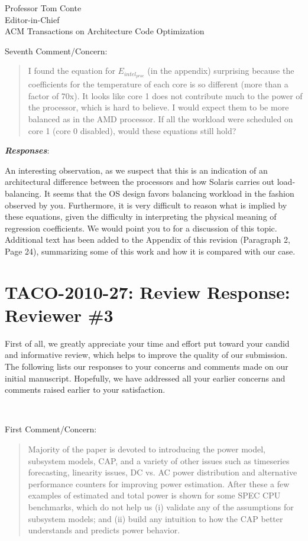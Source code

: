 \documentclass[10pt]{letter} %
\newenvironment{rviewcomment}
{~\\%
\begin{bfseries}}
{\end{bfseries}}
\newcommand{\rviewresponses}{\textbf{\textit{Responses}}:}
\begin{document}
\begin{letter}{Professor Tom Conte \\
Editor-in-Chief \\
ACM Transactions on Architecture Code Optimization }
\begin{rviewcomment}
  Seventh Comment/Concern:
\end{rviewcomment}
\begin{quote}
\begin{itshape}
I found the equation for $E_{intel_{proc}}$ (in the appendix) surprising
because the coefficients for the temperature of each core is so
different (more than a factor of 70x). It looks like core 1 does not
contribute much to the power of the processor, which is hard to
believe. I would expect them to be more balanced as in the AMD
processor. If all the workload were scheduled on core 1 (core 0
disabled), would these equations still hold?
\end{itshape}
\end{quote}

\rviewresponses 

An interesting observation, as we suspect that this is
an indication of an architectural difference between the processors and
how Solaris carries out load-balancing.  It seems that the OS design
favors balancing workload in the fashion observed by you.  Furthermore,
it is very difficult to reason what is implied by these equations, given
the difficulty in interpreting the physical meaning of regression
coefficients.  We would point you to \cite{McCullough2011} for a
discussion of this topic. Additional text has been added to the Appendix
of this revision (Paragraph 2, Page 24), summarizing some of this work
and how it is compared with our case.  


\clearpage
\section{TACO-2010-27: Review Response: Reviewer \#3}
\label{sec-3}
First of all, we greatly appreciate your time and effort put toward
your candid and informative review, which helps to improve the quality
of our submission.  The following lists our responses to your concerns
and comments made on our initial manuscript.  Hopefully, we have addressed
all your earlier concerns and comments raised earlier to your satisfaction.

\begin{rviewcomment}
    First Comment/Concern: 
\end{rviewcomment}
\begin{quote}
  \begin{itshape}
    Majority of the paper is devoted to introducing the power model,
    subsystem models, CAP, and a variety of other issues such as
    timeseries forecasting, linearity issues, DC vs. AC power
    distribution and alternative performance counters for improving
    power estimation. After these a few examples of estimated and total
    power is shown for some SPEC CPU benchmarks, which do not help us
    (i) validate any of the assumptions for subsystem models; and (ii)
    build any intuition to how the CAP better understands and predicts
    power behavior.


\end{itshape}
\end{quote}
\end{letter}
\end{document}
